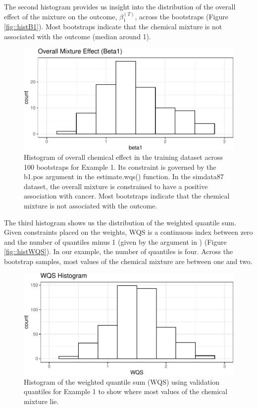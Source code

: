 The second histogram provides us insight into the distribution of the
overall effect of the mixture on the outcome, \(\beta^{(T)}_1\), across
the bootstraps (Figure \ref{fig::histB1}). Most bootstraps indicate that
the chemical mixture is not associated with the outcome (median around
1).


\begin{figure}[h]

{\centering \includegraphics{hargarten_wheeler_files/figure-latex/histB1-1.pdf} 

}

\caption{\label{fig::histB1} Histogram of overall chemical effect in the training dataset across 100 bootstraps for Example 1. Its constraint is governed by the b1.pos argument in the estimate.wqs() function. In the simdata87 dataset, the overall mixture is constrained to have a positive association with cancer. Most bootstraps indicate that the chemical mixture is not associated with the outcome.}\label{fig:histB1}
\end{figure}


The third histogram shows us the distribution of the weighted quantile
sum. Given constraints placed on the weights, WQS is a continuous index
between zero and the number of quantiles minus 1 (given by the
 argument in  ) (Figure
\ref{fig::histWQS}). In our example, the number of quantiles is four.
Across the bootstrap samples, most values of the chemical mixture are
between one and two.


\begin{figure}[h]

{\centering \includegraphics[width=0.85\linewidth]{hargarten_wheeler_files/figure-latex/histWQS-1.pdf} 

}

\caption{\label{fig::histWQS} Histogram of the weighted quantile sum (WQS) using validation quantiles for Example 1 to show where most values of the chemical mixture lie.}\label{fig:histWQS}
\end{figure}


